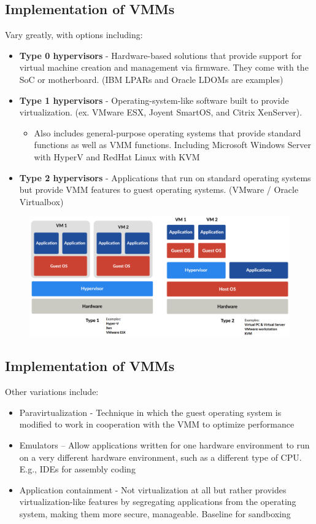 \subsection{Implementation of VMMs}
Vary greatly, with options including:

\begin{itemize}
    \item \textbf{Type 0 hypervisors} - Hardware-based solutions that provide support for virtual machine creation and management via firmware. They come with the SoC or motherboard. (IBM LPARs and Oracle LDOMs are examples)
    \item \textbf{Type 1 hypervisors} - Operating-system-like software built to provide virtualization. (ex. VMware ESX, Joyent SmartOS, and Citrix XenServer).
    \begin{itemize}
    \item Also includes general-purpose operating systems that provide standard functions as well as VMM functions. Including Microsoft Windows Server with HyperV and RedHat Linux with KVM
    \end{itemize}
    \item \textbf{Type 2 hypervisors} - Applications that run on standard operating systems but provide VMM features to guest operating systems. (VMware / Oracle Virtualbox)
\end{itemize}

\begin{figure}[h!]
    \centering
    \includegraphics[width=0.6\linewidth]{img/dfsnbndbfg.png}
\end{figure}


\subsection{Implementation of VMMs}

Other variations include: 

\begin{itemize}
    \item Paravirtualization - Technique in which the guest operating system is modified to work in cooperation with the VMM to optimize performance
    \item Emulators – Allow applications written for one hardware environment to run on a very different hardware environment, such as a different type of CPU. E.g., IDEs for assembly coding
    \item Application containment - Not virtualization at all but rather provides virtualization-like features by segregating applications from the operating system, making them more secure, manageable. Baseline for sandboxing
\end{itemize}

